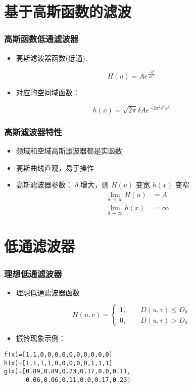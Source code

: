 \documentclass{beamer}
\begin{document}
\section{基于高斯函数的滤波}
\label{sec-6}
\begin{frame}
\frametitle{高斯函数低通滤波器}
\label{sec-6-1}

\begin{itemize}
\item 高斯滤波器函数(低通):
\end{itemize}
\[ H(u)=Ae^{\frac{-u^2}{2\delta^2}} \]
\begin{itemize}
\item 对应的空间域函数：
\end{itemize}
\[ h(x)=\sqrt{2\pi}\delta Ae^{-2\pi^2\delta^2 x^2}\]
\end{frame}
\begin{frame}
\frametitle{高斯滤波器特性}
\label{sec-6-2}

\begin{itemize}
\item 频域和空域高斯滤波器都是实函数
\item 高斯曲线直观，易于操作
\item 高斯滤波器参数： $\delta$ 增大，则 $H(u)$ 变宽 $h(x)$ 变窄
   \begin{align*}
   \lim_{\delta\to\infty} H(u) &=A \\
   \lim_{\delta\to\infty} h(x) &=\infty
   \end{align*}
\end{itemize}
\end{frame}
\section{低通滤波器}
\label{sec-7}
\begin{frame}[fragile]
\frametitle{理想低通滤波器}
\label{sec-7-1}

\begin{itemize}
\item 理想低通滤波器函数
\end{itemize}
\[ H(u,v) =\begin{cases} 1, \qquad D(u,v) \leq D_0 \\ 0, \qquad D(u,v) > D_0 \end{cases} \]
\begin{itemize}
\item 振铃现象示例：
\end{itemize}

\begin{verbatim}
f(x)=[1,1,0,0,0,0,0,0,0,0,0,0]
h(x)=[1,1,1,1,0,0,0,0,0,1,1,1]
g(x)=[0.89,0.89,0.23,0.17,0.0,0.11,
      0.06,0.06,0.11,0.0,0.17,0.23]
\end{verbatim}
\end{frame}
\end{document}
